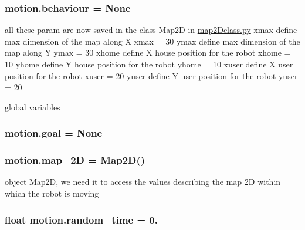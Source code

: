 \subsubsection[{\texorpdfstring{behaviour}{behaviour}}]{\setlength{\rightskip}{0pt plus 5cm}motion.\+behaviour = None}\hypertarget{namespacemotion_a15d63b2a70ac940f179085ce72871c86}{}\label{namespacemotion_a15d63b2a70ac940f179085ce72871c86}


all these param are now saved in the class Map2D in \hyperlink{map2Dclass_8py}{map2\+Dclass.\+py} xmax define max dimension of the map along X xmax = 30 ymax define max dimension of the map along Y ymax = 30 xhome define X house position for the robot xhome = 10 yhome define Y house position for the robot yhome = 10 xuser define X user position for the robot xuser = 20 yuser define Y user position for the robot yuser = 20 

global variables 
\subsubsection[{\texorpdfstring{goal}{goal}}]{\setlength{\rightskip}{0pt plus 5cm}motion.\+goal = None}\hypertarget{namespacemotion_a6427953689c120f9b8a1cb3646733b85}{}\label{namespacemotion_a6427953689c120f9b8a1cb3646733b85}
\subsubsection[{\texorpdfstring{map\+\_\+2D}{map_2D}}]{\setlength{\rightskip}{0pt plus 5cm}motion.\+map\+\_\+2D = {\bf Map2D}()}\hypertarget{namespacemotion_a858c2a633daaa0a83b599397041f524b}{}\label{namespacemotion_a858c2a633daaa0a83b599397041f524b}


object Map2D, we need it to access the values describing the map 2D within which the robot is moving 

\subsubsection[{\texorpdfstring{random\+\_\+time}{random_time}}]{\setlength{\rightskip}{0pt plus 5cm}float motion.\+random\+\_\+time = 0.}\hypertarget{namespacemotion_a577a5f71c1bdf849f48eed17c4134bee}{}\label{namespacemotion_a577a5f71c1bdf849f48eed17c4134bee}
